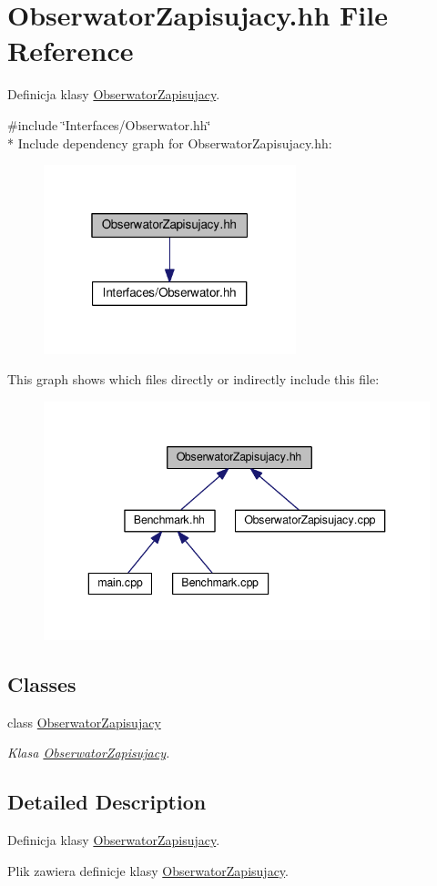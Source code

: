 \hypertarget{a00053}{}\section{Obserwator\+Zapisujacy.\+hh File Reference}
\label{a00053}


Definicja klasy \hyperlink{a00016}{Obserwator\+Zapisujacy}.  


{\ttfamily \#include \char`\"{}Interfaces/\+Obserwator.\+hh\char`\"{}}\\*
Include dependency graph for Obserwator\+Zapisujacy.\+hh\+:
\nopagebreak
\begin{figure}[H]
\begin{center}
\leavevmode
\includegraphics[width=208pt]{a00107}
\end{center}
\end{figure}
This graph shows which files directly or indirectly include this file\+:
\nopagebreak
\begin{figure}[H]
\begin{center}
\leavevmode
\includegraphics[width=343pt]{a00108}
\end{center}
\end{figure}
\subsection*{Classes}
\begin{DoxyCompactItemize}
\item 
class \hyperlink{a00016}{Obserwator\+Zapisujacy}
\begin{DoxyCompactList}\small\item\em Klasa \hyperlink{a00016}{Obserwator\+Zapisujacy}. \end{DoxyCompactList}\end{DoxyCompactItemize}


\subsection{Detailed Description}
Definicja klasy \hyperlink{a00016}{Obserwator\+Zapisujacy}. 

Plik zawiera definicje klasy \hyperlink{a00016}{Obserwator\+Zapisujacy}. 
